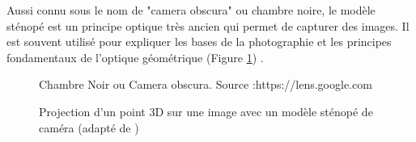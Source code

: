  Aussi connu sous le nom de "camera obscura" ou chambre noire, le modèle sténopé est un principe optique très ancien qui permet de capturer des images. Il est souvent utilisé pour expliquer les bases de la photographie et les principes fondamentaux de l'optique géométrique (Figure \ref{fig:Chambre Noir}) . 
 
  \begin{figure}[H]%
  	\center%
  	\setlength{\fboxsep}{5pt}%
  	\setlength{\fboxrule}{0.5pt}%
  		\caption[Chambre Noir]{Chambre Noir ou Camera obscura. Source :https://lens.google.com}
  	\label{fig:Chambre Noir}
  \end{figure}
  
   \begin{figure}[H]%
  	\center%
  	\setlength{\fboxsep}{5pt}%
  	\setlength{\fboxrule}{0.5pt}%
  	\caption[Représentation du modèl sténopé]{Projection d’un point 3D sur une image avec un modèle sténopé de caméra (adapté de \cite{eikosim_etalonnage_2021})}
    \label{fig:Représentation du modèl sténopé}
  \end{figure}
  
